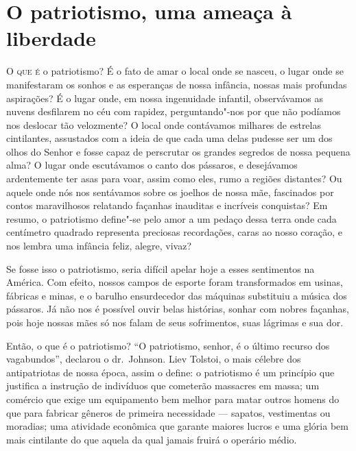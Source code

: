 \chapter{O patriotismo, uma ameaça à liberdade}

\textsc{O que é} o patriotismo? É o fato de amar o local onde se nasceu, o lugar
onde se manifestaram os sonhos e as esperanças de nossa infância,
nossas mais profundas aspirações? É o lugar onde, em nossa ingenuidade
infantil, observávamos as nuvens desfilarem no céu com rapidez,
perguntando"-nos por que não podíamos nos deslocar tão velozmente? O
local onde contávamos milhares de estrelas cintilantes, assustados com
a ideia de que cada uma delas pudesse ser um dos olhos do Senhor e
fosse capaz de perscrutar os grandes segredos de nossa pequena alma? O
lugar onde escutávamos o canto dos pássaros, e desejávamos ardentemente
ter asas para voar, assim como eles, rumo a regiões distantes? Ou
aquele onde nós nos sentávamos sobre os joelhos de nossa mãe,
fascinados por contos maravilhosos relatando façanhas inauditas e
incríveis conquistas? Em resumo, o patriotismo define"-se pelo amor a
um pedaço dessa terra onde cada centímetro quadrado representa
preciosas recordações, caras ao nosso coração, e nos lembra uma
infância feliz, alegre, vivaz?

Se fosse isso o patriotismo, seria difícil apelar hoje a esses
sentimentos na América. Com efeito, nossos campos de esporte foram
transformados em usinas, fábricas e minas, e o barulho ensurdecedor das
máquinas substituiu a música dos pássaros. Já não nos é possível ouvir
belas histórias, sonhar com nobres façanhas, pois hoje nossas mães só
nos falam de seus sofrimentos, suas lágrimas e sua dor.

Então, o que é o patriotismo? “O patriotismo, senhor, é o último recurso
dos vagabundos”, declarou o dr.~Johnson. Liev Tolstoi, o mais célebre
dos antipatriotas de nossa época, assim o define: o patriotismo é um
princípio que justifica a instrução de indivíduos que cometerão
massacres em massa; um comércio que exige um equipamento bem melhor
para matar outros homens do que para fabricar gêneros de primeira
necessidade --- sapatos, vestimentas ou moradias; uma atividade econômica
que garante maiores lucros e uma glória bem mais cintilante do que
aquela da qual jamais fruirá o operário médio.

